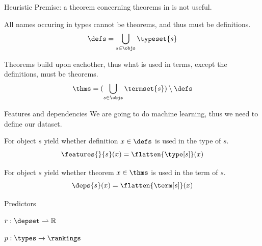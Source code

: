\documentclass[department=ds, notes={hide notes}, slidesperpage=1]{beamerruhuisstijl}
\begin{document}
\begin{frame}{Heuristic}
	Premise: a theorem concerning theorems in \coq is not useful.
	\bigskip
	\begin{definition}[$\defs$]
		All names occuring in types cannot be theorems, and thus must be definitions.
		\[ \defs = \bigcup_{s \in \objs} \typeset{s} \]
	\end{definition}
	\bigskip
	\begin{definition}[$\thms$]
		Theorems build upon eachother, thus what is used in terms, except the definitions, must be theorems.
		\[ \thms = (\bigcup_{s \in \objs} \termset{s}) \setminus \defs \]
	\end{definition}
\end{frame}

\begin{frame}{Features and dependencies}
	We are going to do machine learning, thus we need to define our dataset.
	\bigskip
	\begin{definition}[Features]
		For object $s$ yield whether definition $x \in \defs$ is used in the type of $s$.
		\[ \features{}{s}(x) = \flatten{\type[s]}(x) \]
	\end{definition}
	\bigskip
	\begin{definition}[Dependencies]
		For object $s$ yield whether theorem $x \in \thms$ is used in the term of $s$.
		\[ \deps{s}(x) = \flatten{\term[s]}(x) \]
	\end{definition}
\end{frame}

\begin{frame}{Predictors}
	\begin{definition}
		$ r : \depset \rightharpoonup \mathbb{R} $
	\end{definition}
	\bigskip
	\begin{definition}
		$ p : \types \rightarrow \rankings $
	\end{definition}
\end{frame}
\end{document}
